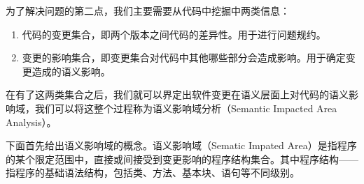 %


%



%
%



为了解决问题的第二点，我们主要需要从代码中挖掘中两类信息：
\begin{enumerate}
	\item 代码的变更集合，即两个版本之间代码的差异性。用于进行问题规约。
	\item 变更的影响集合，即变更集合对代码中其他哪些部分会造成影响。用于确定变更造成的语义影响。
\end{enumerate}

在有了这两类集合之后，我们就可以界定出软件变更在语义层面上对代码的语义影响域，我们可以将这整个过程称为语义影响域分析（Semantic Impacted Area Analysis）。

下面首先给出语义影响域的概念。语义影响域（Sematic Impated Area）是指程序的某个限定范围中，直接或间接受到变更影响的程序结构集合。其中程序结构——指程序的基础语法结构，包括类、方法、基本块、语句等不同级别。

